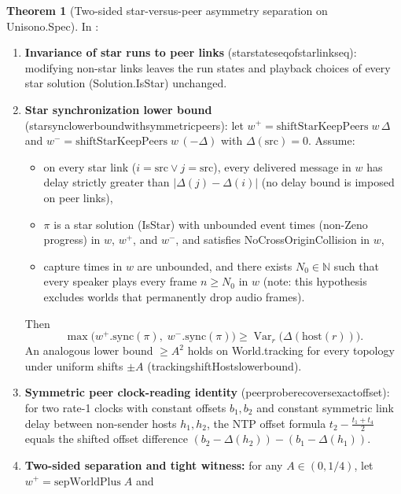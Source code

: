 \documentclass[11pt,a4paper]{article}
\DeclareRobustCommand{\lean}[1]{{\ttfamily\def\_{\textunderscore\allowbreak}#1}}
\theoremstyle{definition}
\newtheorem{theorem}[definition]{Theorem}
\begin{document}
\begin{theorem}[Two-sided star-versus-peer asymmetry separation on \lean{Unisono.Spec}]
\label{thm:star-peer-sep}
In :
\begin{enumerate}
\item \textbf{Invariance of star runs to peer links}
  (\lean{star\_states\_eq\_of\_star\_links\_eq}): modifying non-star links
  leaves the run states and playback choices of every star solution
  (\lean{Solution.IsStar}) unchanged.
\item \textbf{Star synchronization lower bound}
  (\lean{star\_sync\_lower\_bound\_with\_symmetric\_peers}): let
  $w^+ = \mathrm{shiftStarKeepPeers}\;w\,\Delta$ and
  $w^- = \mathrm{shiftStarKeepPeers}\;w\,(-\Delta)$ with $\Delta(\mathrm{src}) = 0$.
  Assume:
  \begin{itemize}
  \item on every star link ($i = \mathrm{src} \lor j = \mathrm{src}$), every
    delivered message in $w$ has delay strictly greater than
    $|\Delta(j) - \Delta(i)|$ (no delay bound is imposed on peer links),
  \item $\pi$ is a star solution (\lean{IsStar}) with unbounded event times
    (non-Zeno progress) in $w$, $w^+$, and $w^-$, and satisfies
    \lean{NoCrossOriginCollision} in $w$,
  \item capture times in $w$ are unbounded, and there exists $N_0 \in \mathbb{N}$
    such that every speaker plays every frame $n \ge N_0$ in $w$ (note: this
    hypothesis excludes worlds that permanently drop audio frames).
  \end{itemize}
  Then
  \[
    \max\bigl(w^+.\mathrm{sync}(\pi),\; w^-.\mathrm{sync}(\pi)\bigr)
    \ge \operatorname{Var}_r\bigl(\Delta(\mathrm{host}(r))\bigr) .
  \]
  An analogous lower bound $\ge A^2$ holds on \lean{World.tracking} for every
  topology under uniform shifts $\pm A$ (\lean{tracking\_shiftHosts\_lower\_bound}).
\item \textbf{Symmetric peer clock-reading identity}
  (\lean{peer\_probe\_recovers\_exact\_offset}): for two rate-1 clocks with
  constant offsets $b_1, b_2$ and constant symmetric link delay between
  non-sender hosts $h_1, h_2$, the NTP offset formula \cite{mills2010}
  $t_2 - \frac{t_1 + t_4}{2}$ equals the shifted offset difference
  $(b_2 - \Delta(h_2)) - (b_1 - \Delta(h_1))$.
\item \textbf{Two-sided separation and tight witness:}
  for any $A \in (0, 1/4)$, let $w^+ = \mathrm{sepWorldPlus}\;A$ and

\end{enumerate}
\end{theorem}
\end{document}
